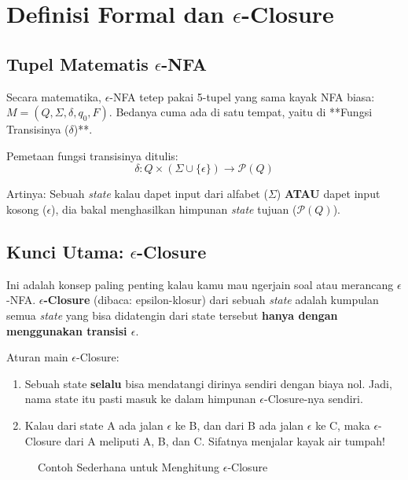 \documentclass[12pt,a4paper]{article}
\begin{document}
\newpage
\section{Definisi Formal dan $\epsilon$-Closure}

\subsection{Tupel Matematis $\epsilon$-NFA}
Secara matematika, $\epsilon$-NFA tetep pakai 5-tupel yang sama kayak NFA biasa: $M = (Q, \Sigma, \delta, q_0, F)$. Bedanya cuma ada di satu tempat, yaitu di **Fungsi Transisinya ($\delta$)**.

Pemetaan fungsi transisinya ditulis:
\[ \delta : Q \times (\Sigma \cup \{\epsilon\}) \rightarrow \mathcal{P}(Q) \]

Artinya: Sebuah \textit{state} kalau dapet input dari alfabet ($\Sigma$) \textbf{ATAU} dapet input kosong ($\epsilon$), dia bakal menghasilkan himpunan \textit{state} tujuan ($\mathcal{P}(Q)$).

\subsection{Kunci Utama: $\epsilon$-Closure}
Ini adalah konsep paling penting kalau kamu mau ngerjain soal atau merancang $\epsilon$-NFA. \textbf{$\epsilon$-Closure} (dibaca: epsilon-klosur) dari sebuah \textit{state} adalah kumpulan semua \textit{state} yang bisa didatengin dari state tersebut \textbf{hanya dengan menggunakan transisi $\epsilon$}.

Aturan main $\epsilon$-Closure:
\begin{enumerate}
    \item Sebuah state \textbf{selalu} bisa mendatangi dirinya sendiri dengan biaya nol. Jadi, nama state itu pasti masuk ke dalam himpunan $\epsilon$-Closure-nya sendiri.
    \item Kalau dari state A ada jalan $\epsilon$ ke B, dan dari B ada jalan $\epsilon$ ke C, maka $\epsilon$-Closure dari A meliputi A, B, dan C. Sifatnya menjalar kayak air tumpah!
\end{enumerate}

\begin{figure}[h]
    \centering
    \caption{Contoh Sederhana untuk Menghitung $\epsilon$-Closure}
\end{figure}
\end{document}

